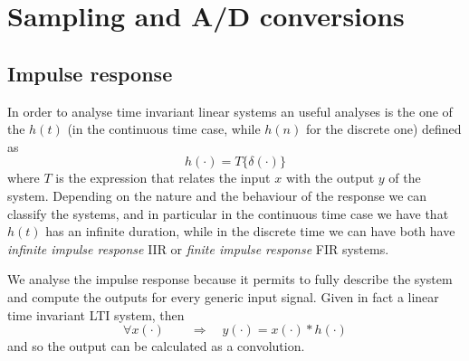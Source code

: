 \chapter{Sampling and A/D conversions}
\section{Impulse response} \label{sec:impulseresponse}
	In order to analyse time invariant linear systems an useful analyses is the one of the  $h(t)$ (in the continuous time case, while $h(n)$ for the discrete one) defined as 
	\begin{equation}
		h(\cdot) = T\big\{ \delta(\cdot) \}
	\end{equation}
	where $T$ is the expression that relates the input $x$ with the output $y$ of the system. Depending on the nature and the behaviour of the response we can classify the systems, and in particular in the continuous time case we have that $h(t)$ has an infinite duration, while in the discrete time we can have both have \textit{infinite impulse response} IIR or \textit{finite impulse response} FIR systems.
	
	We analyse the impulse response because it permits to fully describe the system and compute the outputs for every generic input signal. Given in fact a linear time invariant LTI system, then 
	\[ \forall x(\cdot) \qquad \Rightarrow \quad y(\cdot) = x(\cdot) * h(\cdot) \]
	and so the output can be calculated as a convolution.
	
